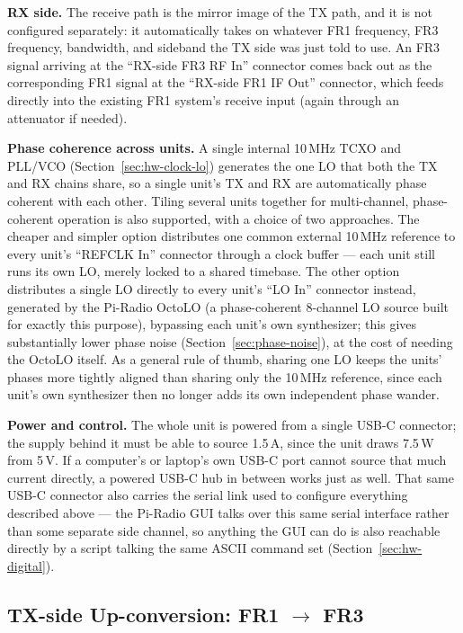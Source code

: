 \textbf{RX side.} The receive path is the mirror image of the TX path, and it is not configured separately: it
automatically takes on whatever FR1 frequency, FR3 frequency, bandwidth, and sideband the TX side was just told
to use. An FR3 signal arriving at the ``RX-side FR3 RF In'' connector comes back out as the corresponding FR1
signal at the ``RX-side FR1 IF Out'' connector, which feeds directly into the existing FR1 system's receive
input (again through an attenuator if needed).

\textbf{Phase coherence across units.} A single internal 10\,MHz TCXO and PLL/VCO (Section~\ref{sec:hw-clock-lo})
generates the one LO that both the TX and RX chains share, so a single unit's TX and RX are automatically phase
coherent with each other. Tiling several units together for multi-channel, phase-coherent operation is also
supported, with a choice of two approaches. The cheaper and simpler option distributes one common external
10\,MHz reference to every unit's ``REFCLK In'' connector through a clock buffer --- each unit still runs its
own LO, merely locked to a shared timebase. The other option distributes a single LO directly to every unit's
``LO In'' connector instead, generated by the Pi-Radio OctoLO (a phase-coherent 8-channel LO source built for
exactly this purpose), bypassing each unit's own synthesizer; this gives substantially lower phase noise
(Section~\ref{sec:phase-noise}), at the cost of needing the OctoLO itself. As a general rule of thumb, sharing one
LO keeps the units' phases more tightly aligned than sharing only the 10\,MHz reference, since each unit's own
synthesizer then no longer adds its own independent phase wander.

\textbf{Power and control.} The whole unit is powered from a single USB-C connector; the supply behind it must
be able to source 1.5\,A, since the unit draws 7.5\,W from 5\,V. If a computer's or laptop's own USB-C port
cannot source that much current directly, a powered USB-C hub in between works just as well. That same USB-C
connector also carries the
serial link used to configure everything described above --- the Pi-Radio GUI talks over this same serial
interface rather than some separate side channel, so anything the GUI can do is also reachable directly by a
script talking the same ASCII command set (Section~\ref{sec:hw-digital}).

\subsection{TX-side Up-conversion: FR1 $\to$ FR3}
\label{sec:hw-tx}

